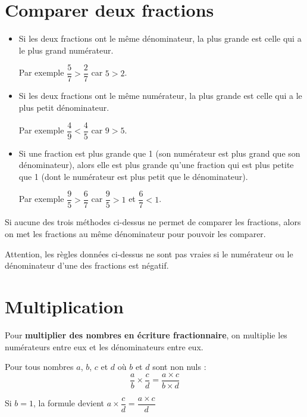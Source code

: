 \section{Comparer deux fractions}

\begin{aconnaitre}
\begin{itemize}
\item Si les deux fractions ont le même dénominateur, la plus grande est celle qui a le plus grand numérateur.

Par exemple $\dfrac{5}{7}>\dfrac{2}{7}$ car $5 > 2$.

\item Si les deux fractions ont le même numérateur, la plus grande est celle qui a le plus petit dénominateur.

Par exemple $\dfrac{4}{9}<\dfrac{4}{5}$ car $9 > 5$.

\item Si une fraction est plus grande que 1 (son numérateur est plus grand que son dénominateur), alors elle est plus grande qu'une fraction qui est plus petite que 1 (dont le numérateur est plus petit que le dénominateur).

Par exemple $\dfrac{9}{5}>\dfrac{6}{7}$ car $\dfrac{9}{5}>1$ et $\dfrac{6}{7}<1$. 
\end{itemize}
\end{aconnaitre}

Si aucune des trois méthodes ci-dessus ne permet de comparer les fractions, alors on met les fractions au même dénominateur pour pouvoir les comparer.

Attention, les règles données ci-dessus ne sont pas vraies si le numérateur ou le dénominateur d'une des fractions est négatif.

\section{Multiplication}

\begin{aconnaitre}
Pour \textbf{multiplier des nombres en écriture fractionnaire}, on multiplie les numérateurs entre eux et les dénominateurs entre eux.

Pour tous nombres $a$, $b$, $c$ et $d$ où $b$ et $d$ sont non nuls :
\[ \dfrac{a}{b} \times \dfrac{c}{d} = \dfrac{a\times c}{b \times d} \]
\end{aconnaitre}

\begin{remarque}
Si $b=1$, la formule devient $a \times \dfrac{c}{d} = \dfrac{a\times c}{d}$
\end{remarque}

